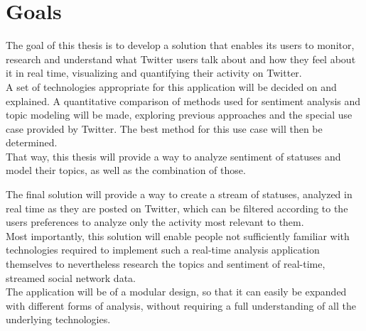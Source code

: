 \chapter{Goals}
\label{ch:goals}

The goal of this thesis is to develop a solution that enables its users to monitor,
research and understand what Twitter users talk about and how they feel about it in real time,
visualizing and quantifying their activity on Twitter.\\
A set of technologies appropriate for this application will be decided on and explained.
A quantitative comparison of methods used for sentiment analysis and topic modeling will be made,
exploring previous approaches and the special use case provided by Twitter.
The best method for this use case will then be determined.\\
That way, this thesis will provide a way to analyze sentiment of statuses and model their topics,
as well as the combination of those.

The final solution will provide a way to create a stream of statuses, analyzed in real time as they are posted on Twitter,
which can be filtered according to the users preferences to analyze only the activity most relevant to them.\\
Most importantly, this solution will enable people not sufficiently familiar with technologies required to
implement such a real-time analysis application themselves to nevertheless research the topics and sentiment of real-time,
streamed social network data.\\
The application will be  of a modular design, so that it can easily be expanded with different forms of analysis,
without requiring a full understanding of all the underlying technologies.
